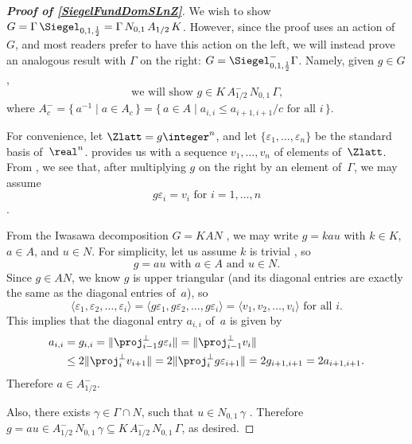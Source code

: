 \begin{proof}[\bf Proof of \cref{SiegelFundDomSLnZ}]
We wish to show $G = \Gamma \, \Siegel_{0,1,\frac{1}{2}} = \Gamma \, N_{0,1} \, A_{1/2} \, K$. However, since the proof uses an action of~$G$, and most readers prefer to have this action on the left, we will instead prove an analogous result with $\Gamma$ on the right: $G = \Siegel_{0,1,\frac{1}{2}}^{-} \Gamma$. 
Namely, given $g \in G$, 
	$$ \text{we will show $g \in K \, A^-_{1/2} \, N_{0,1} \, \Gamma$,} $$
where $A^-_c = \{\, a^{-1} \mid a \in A_c \,\} = \{\, a \in A \mid \text{$a_{i,i} \le a_{i+1,i+1}/c$ for all~$i$} \,\}$.

For convenience, let $\Zlatt = g \integer^n$, and let $\{\varepsilon_1,\ldots,\varepsilon_n\}$ be the standard basis of~$\real^n$.   provides us with a sequence $v_1,\ldots,v_n$ of elements of~$\Zlatt$. From , we see that, after multiplying $g$ on the right by an element of~$\Gamma$, we may assume 
	$$ \text{$g \varepsilon_i = v_i$ for $i = 1,\ldots,n$} $$
. 

From the Iwasawa decomposition $G = KAN$ , we may write
	$g = k a u$ with $k \in K$, $a \in A$, and $u \in N$.
For simplicity, let us assume $k$ is trivial , so
	$$ \text{$g = a u$ with $a \in A$ and $u \in N$.} $$
Since $g \in AN$, we know $g$ is upper triangular (and its diagonal entries are exactly the same as the diagonal entries of~$a$), so
	$$ \text{$\langle \varepsilon_1,\varepsilon_2,\ldots,\varepsilon_i \rangle
	= \langle g \varepsilon_1, g \varepsilon_2, \ldots, g\varepsilon_i \rangle 
	=  \langle v_1,v_2,\ldots,v_i \rangle$ for all~$i$} .$$
This implies that the diagonal entry $a_{i,i}$ of~$a$ is given by
	\begin{align*}
	a_{i,i}
	&=
	g_{i,i}
	=  \| \proj_{i-1}^\perp g \varepsilon_i \| 
	=  \| \proj_{i-1}^\perp v_i \| 
	\\& \le 2 \| \proj_i^\perp v_{i+1} \| 
	=  2\| \proj_i^\perp g \varepsilon_{i+1} \| 
	 = 2 g_{i+1,i+1} 
	 = 2 a_{i+1,i+1}
	 . \end{align*}
Therefore $a \in A_{1/2}^-$.

Also, there exists $ \gamma \in \Gamma \cap N$, such that
	$ u \in N_{0,1} \, \gamma$
.
Therefore $g = a u \in  A_{1/2}^- \, N_{0,1} \, \gamma \subseteq  K \, A_{1/2}^- \, N_{0,1} \, \Gamma$, as desired.
\end{proof}


